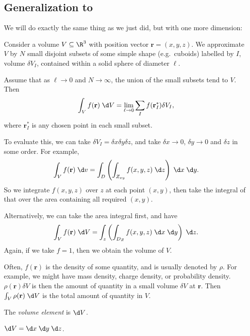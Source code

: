 \documentclass[a4paper]{article}
\begin{document}
\subsection{Generalization to }
We will do exactly the same thing as we just did, but with one more dimension:
\begin{defi}
  Consider a volume $V\subseteq \R^3$ with position vector $\mathbf{r} = (x, y, z)$. We approximate $V$ by $N$ small disjoint subsets of some simple shape (e.g.\ cuboids) labelled by $I$, volume $\delta V_I$, contained within a solid sphere of diameter $\ell$.

  Assume that as $\ell \to 0$ and $N\to \infty$, the union of the small subsets tend to $V$. Then
  \[
    \int_V f(\mathbf{r})\;\d V = \lim_{\ell \to 0} \sum_{I}f(\mathbf{r}_I^*) \delta V_I,
  \]
  where $\mathbf{r}_I^*$ is any chosen point in each small subset.
\end{defi}
To evaluate this, we can take $\delta V_I = \delta x \delta y \delta z$, and take $\delta x\to 0$, $\delta y\to 0$ and $\delta z$ in some order. For example,
\[
  \int_V f(\mathbf{r})\;\d v = \int_D \left(\int_{Z_{xy}}f(x, y, z)\;\d z\right)\;\d x\;\d y.
\]
So we integrate $f(x, y, z)$ over $z$ at each point $(x, y)$, then take the integral of that over the area containing all required $(x, y)$.

Alternatively, we can take the area integral first, and have
\[
  \int_V f(\mathbf{r})\;\d V = \int_z\left(\int_{D_Z} f(x, y, z)\;\d x\;\d y\right)\;\d z.
\]
Again, if we take $f = 1$, then we obtain the volume of $V$.

Often, $f(\mathbf{r})$ is the density of some quantity, and is usually denoted by $\rho$. For example, we might have mass density, charge density, or probability density. $\rho(\mathbf{r})\delta V$ is then the amount of quantity in a small volume $\delta V$ at $\mathbf{r}$. Then $\int_V \rho(\mathbf{r}) \;\d V$ is the total amount of quantity in $V$.

\begin{defi}
  The \emph{volume element} is $\d V$.
\end{defi}

\begin{prop}
  $\d V = \d x\; \d y\; \d z$.
\end{prop}
\end{document}
